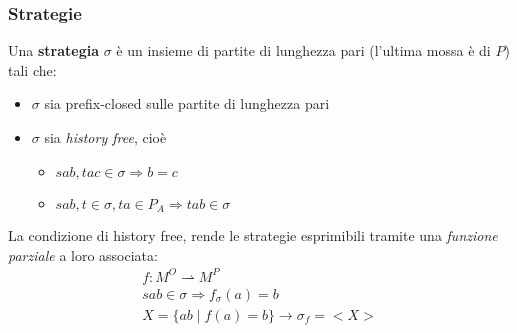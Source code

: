 \documentclass{beamer}
\begin{document}
\begin{frame}
	 {
	
	
	
	}
	
\end{frame}

\begin{frame}

	\frametitle{Strategie}
	
	Una \textbf{strategia} $\sigma$ è un insieme di partite di lunghezza pari (l'ultima mossa è di $P$) tali che:
	\begin{itemize}
		\item<2-> $\sigma$ sia prefix-closed sulle partite di lunghezza pari
		\item<3-> $\sigma$ sia \textit{history free}, cioè
		\begin{itemize}
			\item $sab , tac \in \sigma \Rightarrow b=c$
			\item $sab, t\in \sigma, ta\in P_A \Rightarrow tab\in \sigma$
		\end{itemize}
	\end{itemize}
	
	
	La condizione di history free, rende le strategie esprimibili tramite una \textit{funzione parziale} a loro associata:
	\begin{gather*}
		    f: M^O \rightharpoonup M^P\\
	            sab\in \sigma \Rightarrow f_\sigma(a)=b\\
	            X=\{ab\;|\;f(a)=b\} \rightarrow \sigma_f=<X> 
	\end{gather*}
	
	
\end{frame}
\end{document}
